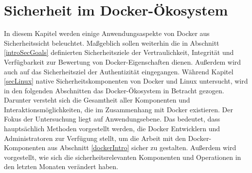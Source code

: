 \documentclass[../main.tex]{subfiles}
\begin{document}



\chapter{Sicherheit im Docker-Ökosystem}
\label{secEcosystem}
  In diesem Kapitel werden einige Anwendungsaspekte von Docker aus Sicherheitssicht beleuchtet. Maßgeblich sollen weiterhin die in Abschnitt \ref{introSecGoals} definierten Sicherheitsziele der Vertraulichkeit, Integrität und Verfügbarkeit zur Bewertung von Docker-Eigenschaften dienen. Außerdem wird auch auf das Sicherheitsziel der Authentizität eingegangen. Während Kapitel \ref{secLinux} native Sicherheitskomponenten von Docker und Linux untersucht, wird in den folgenden Abschnitten das Docker-Ökosystem in Betracht gezogen. Darunter versteht sich die Gesamtheit aller Komponenten und Interaktionsmöglichkeiten, die im Zusammenhang mit Docker existieren. Der Fokus der Untersuchung liegt auf Anwendungsebene. Das bedeutet, dass hauptsächlich Methoden vorgestellt werden, die Docker Entwicklern und Administratoren zur Verfügung stellt, um die Arbeit mit den Docker-Komponenten aus Abschnitt \ref{dockerIntro} sicher zu gestalten. Außerdem wird vorgestellt, wie sich die sicherheitsrelevanten Komponenten und Operationen in den letzten Monaten verändert haben.



\end{document}
